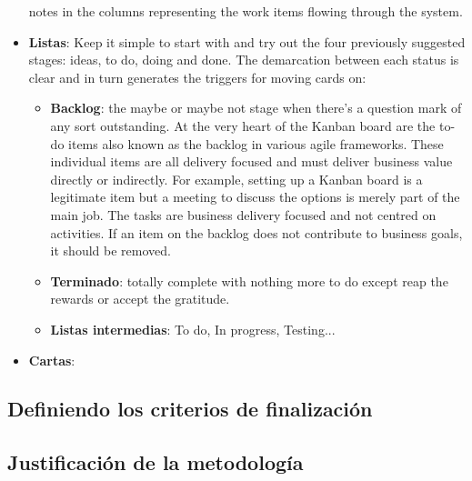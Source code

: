 \begin{itemize}
    notes in the columns representing the work items flowing through the system.
    \item \textbf{Listas}:
    Keep it simple to start with and try out the four previously
    suggested stages: ideas, to do, doing and done. The demarcation between each
    status is clear and in turn generates the triggers for moving cards on:
    \begin{itemize}
        \item \textbf{Backlog}: the maybe or maybe not stage when there's a question
        mark of any sort outstanding. At the very heart of the Kanban board are the to-do items also
        known as the backlog in various agile frameworks. These individual
        items are all delivery focused and must deliver business value
        directly or indirectly. For example, setting up a Kanban board is
        a legitimate item but a meeting to discuss the options is merely
        part of the main job. The tasks are business delivery focused
        and not centred on activities. If an item on the backlog does not
        contribute to business goals, it should be removed.
        \item \textbf{Terminado}: totally complete with nothing more to do except reap
        the rewards or accept the gratitude.
        \item \textbf{Listas intermedias}: To do, In progress, Testing...
    \end{itemize}
    \item \textbf{Cartas}:
\end{itemize}

\subsection{Definiendo los criterios de finalización}

\subsection{Justificación de la metodología}



